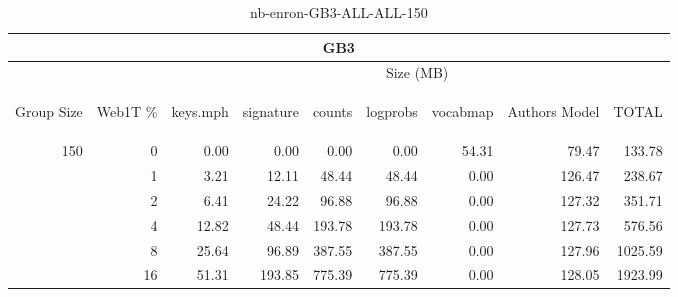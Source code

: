 \begin{center}
\begin{table}[htbp]
\begin{tabular}{ | r | r | r | r | r | r | r | r | r |}
\hline
\multicolumn{9}{|c|}{GB3}\\
\hline
 & & \multicolumn{7}{|c|}{Size (MB)}\\ \cline{3-9}
\begin{sideways}Group Size\end{sideways} & \begin{sideways}Web1T \% \end{sideways} & \begin{sideways}keys.mph\end{sideways} & \begin{sideways}signature\end{sideways} & \begin{sideways}counts\end{sideways} & \begin{sideways}logprobs\end{sideways} & \begin{sideways}vocabmap\end{sideways} & \begin{sideways}Authors Model \end{sideways} & \begin{sideways}TOTAL\end{sideways}\\
\hline
\multirow{5}{*}{150}
 & 0 & 0.00 & 0.00 & 0.00 & 0.00 & 54.31 & 79.47 & 133.78\\ \cline{2-9}
 & 1 & 3.21 & 12.11 & 48.44 & 48.44 & 0.00 & 126.47 & 238.67\\ \cline{2-9}
 & 2 & 6.41 & 24.22 & 96.88 & 96.88 & 0.00 & 127.32 & 351.71\\ \cline{2-9}
 & 4 & 12.82 & 48.44 & 193.78 & 193.78 & 0.00 & 127.73 & 576.56\\ \cline{2-9}
 & 8 & 25.64 & 96.89 & 387.55 & 387.55 & 0.00 & 127.96 & 1025.59\\ \cline{2-9}
 & 16 & 51.31 & 193.85 & 775.39 & 775.39 & 0.00 & 128.05 & 1923.99\\ \cline{2-9}
\hline
\end{tabular}
\caption{nb-enron-GB3-ALL-ALL-150}
\label{table:nb-enron-GB3-ALL-ALL-150}
\end{table}
\end{center}

